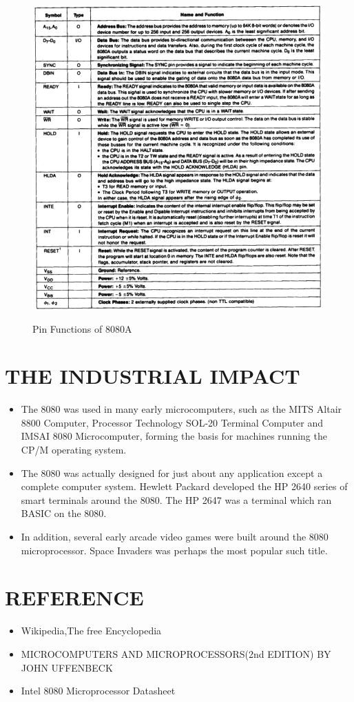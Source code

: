 \documentclass[conference]{IEEEtran}
\begin{document}
\begin{figure}[!h]
\begin{center}
{\scalebox{0.5} {\includegraphics{pinfn.jpg}}}
\caption{Pin Functions of 8080A}
\end{center}
\end{figure}
\clearpage
\section{\large THE INDUSTRIAL IMPACT}
\begin{itemize}
\item The 8080 was used in many early microcomputers, such as the MITS Altair 8800 Computer, Processor Technology SOL-20 Terminal Computer and IMSAI 8080 Microcomputer, forming the basis for machines running the CP/M operating system.
\item The 8080 was actually designed for just about any application except a complete computer system. Hewlett Packard developed the HP 2640 series of smart terminals around the 8080. The HP 2647 was a terminal which ran BASIC on the 8080.
\item In addition, several early arcade video games were built around the 8080 microprocessor. Space Invaders was perhaps the most popular such title.\\
\end{itemize}
\newpage

\section{\large REFERENCE }
\begin{itemize}
\item Wikipedia,The free Encyclopedia
\item MICROCOMPUTERS AND MICROPROCESSORS(2nd EDITION) BY JOHN UFFENBECK
\item Intel 8080 Microprocessor Datasheet
\end{itemize}
\end{document}
